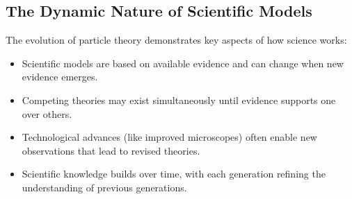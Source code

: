 
\subsection{The Dynamic Nature of Scientific Models}

The evolution of particle theory demonstrates key aspects of how science works:

\begin{itemize}
    \item Scientific models are based on available evidence and can change when new evidence emerges.
    
    \item Competing theories may exist simultaneously until evidence supports one over others.
    
    \item Technological advances (like improved microscopes) often enable new observations that lead to revised theories.
    
    \item Scientific knowledge builds over time, with each generation refining the understanding of previous generations.
\end{itemize}

